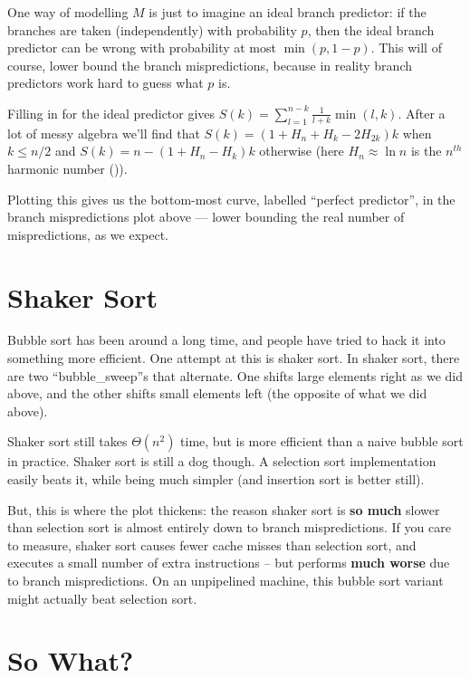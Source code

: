 \documentclass[11pt]{article}
\begin{document}
One way of modelling $M$ is just to imagine an ideal branch predictor: if the branches are taken (independently) with probability $p$, then the ideal branch predictor can be wrong with probability at most $\min(p, 1 - p)$. This will of course, lower bound the branch mispredictions, because in reality branch predictors work hard to guess what $p$ is.

Filling in for the ideal predictor gives $S(k) = \sum_{l=1}^{n-k}\frac{1}{l + k}\min(l, k)$. After a lot of messy algebra we'll find that $S(k) = (1 + H_n + H_k - 2H_{2k})k$ when $k \leq n/2$ and $S(k) = n - (1 + H_n - H_k)k$ otherwise (here $H_n \approx \ln n$ is the $n^{th}$ harmonic number (\texttt{})). 

Plotting this gives us the bottom-most curve, labelled ``perfect predictor'', in the branch mispredictions plot above --- lower bounding the real number of mispredictions, as we expect.

\section{Shaker Sort}

Bubble sort has been around a long time, and people have tried to hack it into something more efficient. One attempt at this is shaker sort. In shaker sort, there are two ``bubble\_sweep''s that alternate. One shifts large elements right as we did above, and the other shifts small elements left (the opposite of what we did above).

Shaker sort still takes $\Theta(n^2)$ time, but is more efficient than a naive bubble sort in practice. Shaker sort is still a dog though. A selection sort implementation easily beats it, while being much simpler (and insertion sort is better still).

But, this is where the plot thickens: the reason shaker sort is \textbf{so much} slower than selection sort is almost entirely down to branch mispredictions. If you care to measure, shaker sort causes fewer cache misses than selection sort, and executes a small number of extra instructions -- but performs \textbf{much worse} due to branch mispredictions. On an unpipelined machine, this bubble sort variant might actually beat selection sort.

\section{So What?}
\end{document}
